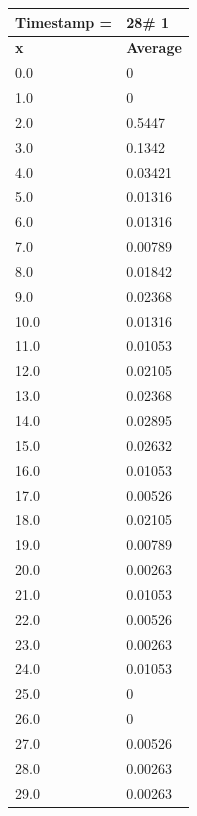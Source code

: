 \begin{tabular}{|l||l|}
\hline
\textbf{Timestamp =} & \textbf{28}\# 1\\\hline
	\textbf{x} & \textbf{Average} \\ \hline
\hline
	0.0 & 0 \\ \hline
	1.0 & 0 \\ \hline
	2.0 & 0.5447 \\ \hline
	3.0 & 0.1342 \\ \hline
	4.0 & 0.03421 \\ \hline
	5.0 & 0.01316 \\ \hline
	6.0 & 0.01316 \\ \hline
	7.0 & 0.00789 \\ \hline
	8.0 & 0.01842 \\ \hline
	9.0 & 0.02368 \\ \hline
	10.0 & 0.01316 \\ \hline
	11.0 & 0.01053 \\ \hline
	12.0 & 0.02105 \\ \hline
	13.0 & 0.02368 \\ \hline
	14.0 & 0.02895 \\ \hline
	15.0 & 0.02632 \\ \hline
	16.0 & 0.01053 \\ \hline
	17.0 & 0.00526 \\ \hline
	18.0 & 0.02105 \\ \hline
	19.0 & 0.00789 \\ \hline
	20.0 & 0.00263 \\ \hline
	21.0 & 0.01053 \\ \hline
	22.0 & 0.00526 \\ \hline
	23.0 & 0.00263 \\ \hline
	24.0 & 0.01053 \\ \hline
	25.0 & 0 \\ \hline
	26.0 & 0 \\ \hline
	27.0 & 0.00526 \\ \hline
	28.0 & 0.00263 \\ \hline
	29.0 & 0.00263 \\ \hline
\end{tabular}
